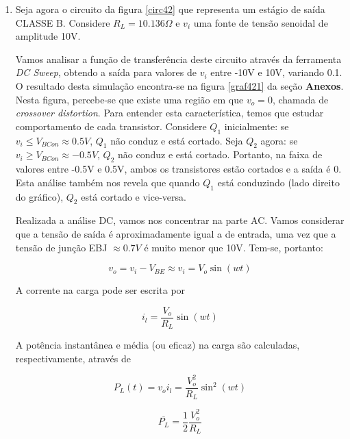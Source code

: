 \documentclass[12pt, a4paper]{article}
\begin{document}
\begin{enumerate}
    
    
    
    
    \item Seja agora o circuito da figura \ref{circ42} que representa um estágio de saída CLASSE B. Considere \(R_L = 10.136 \Omega \) e \(v_i\) uma fonte de tensão senoidal de amplitude 10V.
    
    Vamos analisar a função de transferência deste circuito através da ferramenta \textit{DC Sweep}, obtendo a saída para valores de \(v_i\) entre -10V e 10V, variando 0.1. O resultado desta simulação encontra-se na figura \ref{graf421} da seção \textbf{Anexos}. Nesta figura, percebe-se que existe uma região em que \(v_o = 0\), chamada de \textit{crossover distortion}. Para entender esta característica, temos que estudar comportamento de cada transistor. Considere \(Q_1\) inicialmente: se \(v_i \le V_{BCon} \approx 0.5V\), \(Q_1\) não conduz e está cortado. Seja \(Q_2\) agora: se \(v_i \ge V_{BCon} \approx -0.5V\), \(Q_2\) não conduz e está cortado. Portanto, na faixa de valores entre -0.5V e 0.5V, ambos os transistores estão cortados e a saída é 0. Esta análise também nos revela que quando \(Q_1\) está conduzindo (lado direito do gráfico), \(Q_2\) está cortado e vice-versa.
    
    Realizada a análise DC, vamos nos concentrar na parte AC. Vamos considerar que a tensão de saída é aproximadamente igual a de entrada, uma vez que a tensão de junção EBJ \(\approx 0.7V\) é muito menor que 10V.  Tem-se, portanto:
    
    \begin{equation}
    v_o = v_i - V_{BE} \approx v_i = V_o \sin (wt)
    \end{equation}
    
    A corrente na carga pode ser escrita por 
    
    \begin{equation}
    i_l = \frac{V_o}{R_L} \sin (wt)
    \end{equation}
    
    A potência instantânea e média (ou eficaz) na carga são calculadas, respectivamente,  através de 
    
    \begin{equation}
    P_L (t) = v_o i_l = \frac{V_o^2}{R_L} \sin ^2 (wt)
    \label{eq:potins}
    \end{equation}
    
    \begin{equation}
    \overline{P_L} = \frac{1}{2}\frac{V_o^2}{R_L}
    \label{eq:potLmed}
    \end{equation}
     

\end{enumerate}
\end{document}
